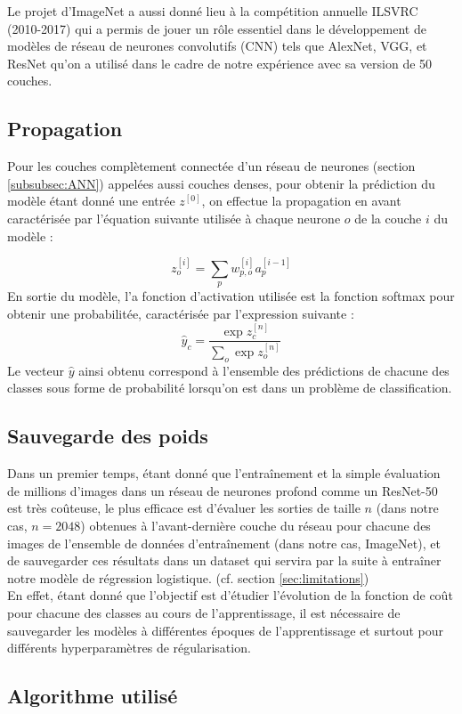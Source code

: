 \documentclass[12pt,english, openany]{book}
\begin{document}
Le projet d'ImageNet a aussi donné lieu à la compétition annuelle ILSVRC (2010-2017) qui a permis de jouer un rôle essentiel dans le développement de modèles de réseau de neurones convolutifs (CNN) tels que AlexNet, VGG, et ResNet qu'on a utilisé dans le cadre de notre expérience avec sa version de 50 couches.
\subsection{Propagation}

Pour les couches complètement connectée d'un réseau de neurones (section \ref{subsubsec:ANN}) appelées aussi couches denses, pour obtenir la prédiction du modèle étant donné une entrée $z^[0]$, on effectue la propagation en avant caractérisée par l'équation suivante utilisée à chaque neurone $o$ de la couche $i$ du modèle : 

$$
    z_{o}^{[i]} = \sum_{p} w^{[i]}_{p,o}a_{p}^{[i-1]}
$$
En sortie du modèle, l'a fonction d'activation utilisée est la fonction softmax pour obtenir une probabilitée, caractérisée par l'expression suivante :
$$
    \hat{y}_c = \frac{\exp{z_{c}^{[n]}}}{\sum_{o}\exp{z_{o}^{[n]}}}
$$
Le vecteur $\hat{y}$ ainsi obtenu correspond à l'ensemble des prédictions de chacune des classes sous forme de probabilité lorsqu'on est dans un problème de classification.

\subsection{Sauvegarde des poids}
\label{subsec:save_weights}
Dans un premier temps, étant donné que l'entraînement et la simple évaluation de millions d'images dans un réseau de neurones profond comme un ResNet-50 est très coûteuse, le plus efficace est d'évaluer les sorties de taille $n$ (dans notre cas, $n=2048$) obtenues à l'avant-dernière couche du réseau pour chacune des images de l'ensemble de données d'entraînement (dans notre cas, ImageNet), et de sauvegarder ces résultats dans un dataset qui servira par la suite à entraîner notre modèle de régression logistique. (cf. section \ref{sec:limitations})\\

En effet, étant donné que l'objectif est d'étudier l'évolution de la fonction de coût pour chacune des classes au cours de l'apprentissage, il est nécessaire de sauvegarder les modèles à différentes époques de l'apprentissage et surtout pour différents hyperparamètres de régularisation. 

\subsection{Algorithme utilisé}
\end{document}
